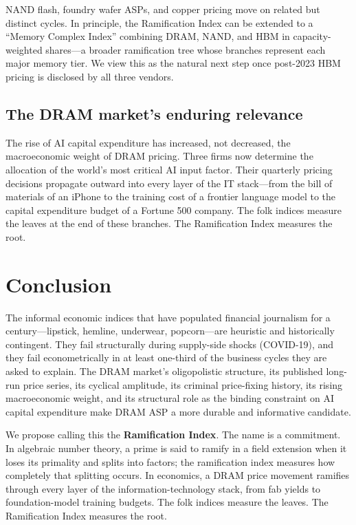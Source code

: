 \documentclass[12pt]{article}
\theoremstyle{definition}
\begin{document}
NAND flash, foundry wafer ASPs, and copper pricing move on related but distinct cycles. In principle, the Ramification Index can be extended to a ``Memory Complex Index'' combining DRAM, NAND, and HBM in capacity-weighted shares---a broader ramification tree whose branches represent each major memory tier. We view this as the natural next step once post-2023 HBM pricing is disclosed by all three vendors.

\subsection{The DRAM market's enduring relevance}

The rise of AI capital expenditure has increased, not decreased, the macroeconomic weight of DRAM pricing. Three firms now determine the allocation of the world's most critical AI input factor. Their quarterly pricing decisions propagate outward into every layer of the IT stack---from the bill of materials of an iPhone to the training cost of a frontier language model to the capital expenditure budget of a Fortune 500 company. The folk indices measure the leaves at the end of these branches. The Ramification Index measures the root.


\section{Conclusion}
\label{sec:conclusion}

The informal economic indices that have populated financial journalism for a century---lipstick, hemline, underwear, popcorn---are heuristic and historically contingent. They fail structurally during supply-side shocks (COVID-19), and they fail econometrically in at least one-third of the business cycles they are asked to explain. The DRAM market's oligopolistic structure, its published long-run price series, its cyclical amplitude, its criminal price-fixing history, its rising macroeconomic weight, and its structural role as the binding constraint on AI capital expenditure make DRAM ASP a more durable and informative candidate.

We propose calling this the \textbf{Ramification Index}. The name is a commitment. In algebraic number theory, a prime is said to ramify in a field extension when it loses its primality and splits into factors; the ramification index measures how completely that splitting occurs. In economics, a DRAM price movement ramifies through every layer of the information-technology stack, from fab yields to foundation-model training budgets. The folk indices measure the leaves. The Ramification Index measures the root.
\end{document}
